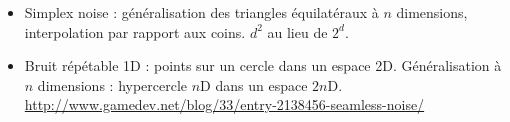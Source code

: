 \documentclass[hyperref={pdfpagelabels=false}]{beamer}
\begin{document}
\begin{frame}
\begin{itemize}
  \item<9-> Simplex noise : généralisation des triangles équilatéraux à $n$ dimensions, interpolation par rapport aux coins. $d^2$ au lieu de $2^d$.
  \item<10-> Bruit répétable 1D : points sur un cercle dans un espace 2D. Généralisation à $n$ dimensions : hypercercle $n$D dans un espace $2n$D.
    {\tiny\url{http://www.gamedev.net/blog/33/entry-2138456-seamless-noise/}}
  \end{itemize}
\end{frame}
\end{document}
